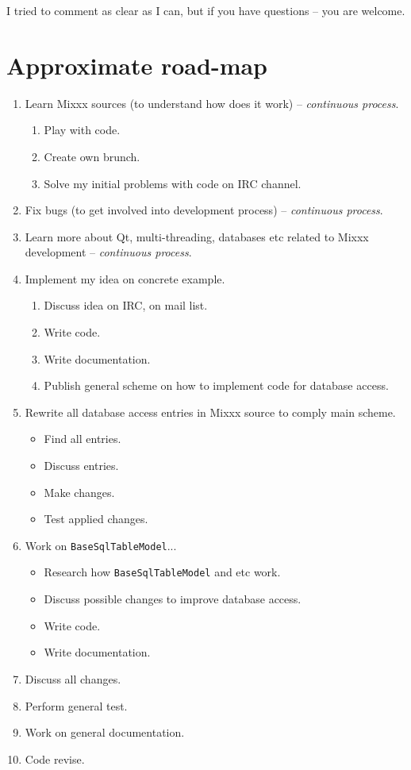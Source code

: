 \documentclass[a4paper,12pt]{scrartcl}
\begin{document}
I tried to comment as clear as I can, but if you have questions -- you are welcome.


\section{Approximate road-map}
\begin{enumerate}
 \item Learn Mixxx sources (to understand how does it work) -- \textit{continuous process}.
 \begin{enumerate}
  \item Play with code.
  \item Create own brunch.
  \item Solve my initial problems with code on IRC channel.
 \end{enumerate}
 \item Fix bugs (to get involved into development process) -- \textit{continuous process}.
 \item Learn more about Qt, multi-threading, databases etc related to Mixxx development -- \textit{continuous process}.
 \item Implement my idea on concrete example.
 \begin{enumerate}
  \item Discuss idea on IRC, on mail list.
  \item Write code.
  \item Write documentation.
  \item Publish general scheme on how to implement code for database access.
 \end{enumerate}
 \item Rewrite all database access entries in Mixxx source to comply main scheme.
 \begin{itemize}
  \item Find all entries.
  \item Discuss entries.
  \item Make changes.
  \item Test applied changes.
 \end{itemize}
 \item Work on \texttt{BaseSqlTableModel}...
 \begin{itemize}
  \item Research how \texttt{BaseSqlTableModel} and etc work.
  \item Discuss possible changes to improve database access.
  \item Write code.
  \item Write documentation.
 \end{itemize}

 \item Discuss all changes.
 \item Perform general test.
 \item Work on general documentation.
 \item Code revise.
\end{enumerate}
\end{document}

